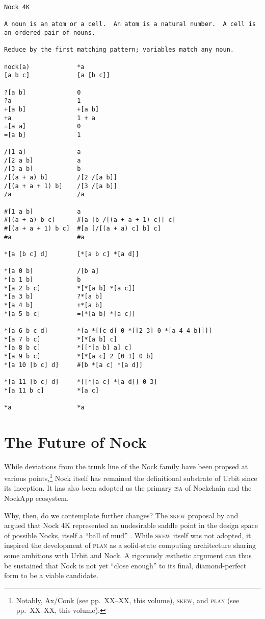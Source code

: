 \documentclass[twoside]{article}
\begin{document}
\begin{lstlisting}[label=lst:nock4k,caption={Nock 4K, October 2018.},style=listingcode]
Nock 4K

A noun is an atom or a cell.  An atom is a natural number.  A cell is an ordered pair of nouns.

Reduce by the first matching pattern; variables match any noun.

nock(a)             *a
[a b c]             [a [b c]]

?[a b]              0
?a                  1
+[a b]              +[a b]
+a                  1 + a
=[a a]              0
=[a b]              1

/[1 a]              a
/[2 a b]            a
/[3 a b]            b
/[(a + a) b]        /[2 /[a b]]
/[(a + a + 1) b]    /[3 /[a b]]
/a                  /a

#[1 a b]            a
#[(a + a) b c]      #[a [b /[(a + a + 1) c]] c]
#[(a + a + 1) b c]  #[a [/[(a + a) c] b] c]
#a                  #a

*[a [b c] d]        [*[a b c] *[a d]]

*[a 0 b]            /[b a]
*[a 1 b]            b
*[a 2 b c]          *[*[a b] *[a c]]
*[a 3 b]            ?*[a b]
*[a 4 b]            +*[a b]
*[a 5 b c]          =[*[a b] *[a c]]

*[a 6 b c d]        *[a *[[c d] 0 *[[2 3] 0 *[a 4 4 b]]]]
*[a 7 b c]          *[*[a b] c]
*[a 8 b c]          *[[*[a b] a] c]
*[a 9 b c]          *[*[a c] 2 [0 1] 0 b]
*[a 10 [b c] d]     #[b *[a c] *[a d]]

*[a 11 [b c] d]     *[[*[a c] *[a d]] 0 3]
*[a 11 b c]         *[a c]

*a                  *a
\end{lstlisting}

\section{The Future of Nock}

While deviations from the trunk line of the Nock family have been propsed at various points,\footnote{Notably, Ax/Conk (see pp.~XX–XX, this volume), \textsc{skew}, and \textsc{plan} (see pp.~XX–XX, this volume).} Nock itself has remained the definitional substrate of Urbit since its inception.  It has also been adopted as the primary \textsc{isa} of Nockchain and the NockApp ecosystem.

Why, then, do we contemplate further changes?  The \textsc{skew} proposal by  and  argued that Nock 4K represented an undesirable saddle point in the design space of possible Nocks, itself a ``ball of mud'' \citep{Skew2020}.  While \textsc{skew} itself was not adopted, it inspired the development of \textsc{plan} as a solid-state computing architecture sharing some ambitions with Urbit and Nock.  A rigorously æsthetic argument can thus be sustained that Nock is not yet ``close enough'' to its final, diamond-perfect form to be a viable candidate.
\end{document}
